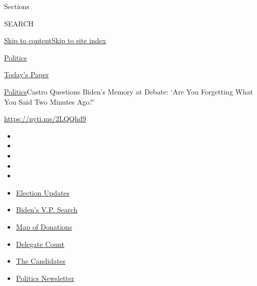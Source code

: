 Sections

SEARCH

\protect\hyperlink{site-content}{Skip to
content}\protect\hyperlink{site-index}{Skip to site index}

\href{https://www.nytimes.com/section/politics}{Politics}

\href{https://myaccount.nytimes.com/auth/login?response_type=cookie\&client_id=vi}{}

\href{https://www.nytimes.com/section/todayspaper}{Today's Paper}

\href{/section/politics}{Politics}\textbar{}Castro Questions Biden's
Memory at Debate: `Are You Forgetting What You Said Two Minutes Ago?'

\url{https://nyti.ms/2LQQhd9}

\begin{itemize}
\item
\item
\item
\item
\item
\end{itemize}

\begin{itemize}
\item
  \href{https://www.nytimes.com/2020/07/31/us/elections/biden-vs-trump.html?action=click\&pgtype=Article\&state=default\&region=TOP_BANNER\&context=storylines_menu}{Election
  Updates}
\item
  \href{https://www.nytimes.com/article/biden-vice-president-2020.html?action=click\&pgtype=Article\&state=default\&region=TOP_BANNER\&context=storylines_menu}{Biden's
  V.P. Search}
\item
  \href{https://www.nytimes.com/interactive/2020/07/24/us/politics/trump-biden-campaign-donors.html?action=click\&pgtype=Article\&state=default\&region=TOP_BANNER\&context=storylines_menu}{Map
  of Donations}
\item
  \href{https://www.nytimes.com/interactive/2020/us/elections/delegate-count-primary-results.html?action=click\&pgtype=Article\&state=default\&region=TOP_BANNER\&context=storylines_menu}{Delegate
  Count}
\item
  \href{https://www.nytimes.com/interactive/2019/us/politics/2020-presidential-candidates.html?action=click\&pgtype=Article\&state=default\&region=TOP_BANNER\&context=storylines_menu}{The
  Candidates}
\item
  \href{https://www.nytimes.com/newsletters/politics?action=click\&pgtype=Article\&state=default\&region=TOP_BANNER\&context=storylines_menu}{Politics
  Newsletter}
\end{itemize}

